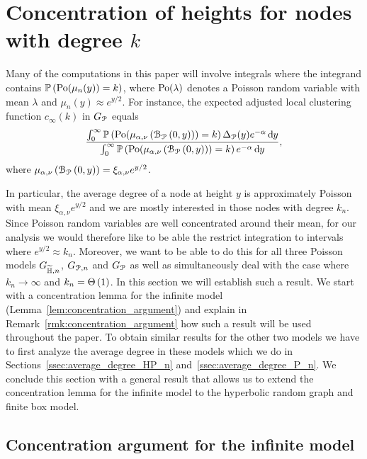 \section{Concentration of heights for nodes with degree $k$}\label{sec:concentration_argument}

Many of the computations in this paper will involve integrals where the integrand contains $\mathbb{P}\left({\mathrm{Po}}(\mu_n(y)) = k\right)$, where ${\mathrm{Po}}(\lambda)$ denotes a Poisson random variable with mean $\lambda$ and $\mu_n(y) \approx e^{y/2}$. For instance, the expected adjusted local clustering function $c_\infty(k)$ in $G_{{\mathcal P}}$ equals
\[
	\frac{\int_0^\infty \mathbb{P}\left({\mathrm{Po}}(\mu_{\alpha,\nu}\left({\mathcal B}_{{\mathcal P}}\left(0,y\right)\right)) = k\right) \Delta_{{\mathcal P}}(y) e^{-\alpha} \operatorname{\mathrm{d}\hspace{-2pt}} y}
	{\int_0^\infty \mathbb{P}\left({\mathrm{Po}}(\mu_{\alpha,\nu}\left({\mathcal B}_{{\mathcal P}}\left(0,y\right)\right)) = k\right) e^{-\alpha} \operatorname{\mathrm{d}\hspace{-2pt}} y},
\]
where $\mu_{\alpha,\nu}\left({\mathcal B}_{{\mathcal P}}\left(0,y\right)\right) = \xi_{\alpha,\nu} e^{y/2}$. 

In particular, the average degree of a node at height $y$ is approximately Poisson with mean $\xi_{\alpha,\nu} e^{y/2}$ and we are mostly interested in those nodes with degree $k_n$. Since Poisson random variables are well concentrated around their mean, for our analysis we would therefore like to be able the restrict integration to intervals where $e^{y/2} \approx k_n$. Moreover, we want to be able to do this for all three Poisson models $G_{\widetilde{\mathbb{H}},n}$, $G_{{\mathcal P},n}$ and $G_{{\mathcal P}}$ as well as simultaneously deal with the case where $k_n \to \infty$ and $k_n = \Theta\left(1\right)$. In this section we will establish such a result. We start with a concentration lemma for the infinite model (Lemma~\ref{lem:concentration_argument}) and explain in Remark~\ref{rmk:concentration_argument} how such a result will be used throughout the paper. To obtain similar results for the other two models we have to first analyze the average degree in these models which we do in Sections~\ref{ssec:average_degree_HP_n} and~\ref{ssec:average_degree_P_n}. We conclude this section with a general result that allows us to extend the concentration lemma for the infinite model to the hyperbolic random graph and finite box model. 

\subsection{Concentration argument for the infinite model}

